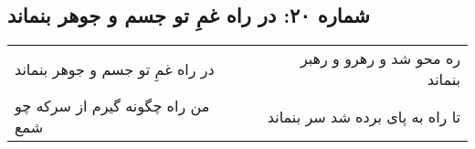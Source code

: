 \begin{center}
\section*{شماره ۲۰: در راه غمِ تو جسم و جوهر بنماند}
\label{sec:020}
\begin{longtable}{l p{0.5cm} r}
در راه غمِ تو جسم و جوهر بنماند
&&
ره محو شد و رهرو و رهبر بنماند
\\
من راه چگونه گیرم از سرکه چو شمع
&&
تا راه به پای برده شد سر بنماند
\\
\end{longtable}
\end{center}
